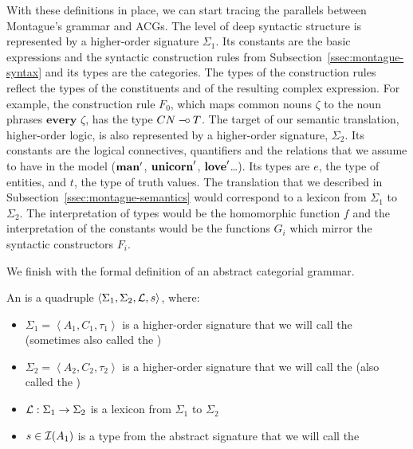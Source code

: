 With these definitions in place, we can start tracing the parallels between
Montague's grammar and ACGs. The level of deep syntactic structure is
represented by a higher-order signature $\Sigma_1$. Its constants are the
basic expressions and the syntactic construction rules from
Subsection~\ref{ssec:montague-syntax} and its types are the categories. The
types of the construction rules reflect the types of the constituents and
of the resulting complex expression. For example, the construction rule
$F_0$, which maps common nouns $\zeta$ to the noun phrases
$\textbf{every }\zeta$, has the type $CN \mathbin{{-}\mkern-3.5mu{\circ}} T$. The target of our
semantic translation, higher-order logic, is also represented by a
higher-order signature, $\Sigma_2$. Its constants are the logical
connectives, quantifiers and the relations that we assume to have in the
model ($\textbf{man}'$, $\textbf{unicorn}'$, $\textbf{love}'$\ldots). Its types are
$e$, the type of entities, and $t$, the type of truth values. The
translation that we described in Subsection~\ref{ssec:montague-semantics}
would correspond to a lexicon from $\Sigma_1$ to $\Sigma_2$. The
interpretation of types would be the homomorphic function $f$ and the
interpretation of the constants would be the functions $G_i$ which mirror
the syntactic constructors $F_i$.

We finish with the formal definition of an abstract categorial grammar.

\begin{definition}
  An  is a quadruple $\left< \Sigma_1,
    \Sigma_2, \mathcal{L}, s \right>$, where:

  \begin{itemize}
  \item $\Sigma_1 = \left< A_1, C_1, \tau_1 \right>$ is a higher-order
    signature that we will call the  (sometimes
    also called the )
  \item $\Sigma_2 = \left< A_2, C_2, \tau_2 \right>$ is a higher-order
    signature that we will call the  (also called
    the )
  \item $\mathcal{L} : \Sigma_1 \to \Sigma_2$ is a lexicon from $\Sigma_1$ to
    $\Sigma_2$
  \item $s \in \mathcal{I}(A_1)$ is a type from the abstract signature that we will
    call the 
  \end{itemize}
\end{definition}

